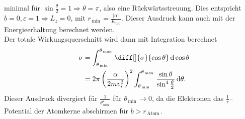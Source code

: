 \documentclass[a4paper,12pt]{article}
\newcommand{\td}{\,\text{d}}
\numberwithin{equation}{section}
\begin{document}
minimal für $\sin \tfrac{\theta }{2}=1\Rightarrow \theta =\pi $, also eine Rückwärtsstreuung. Dies entspricht $b=0,\varepsilon =1\Rightarrow L_z=0$, mit $r_{\,\text{min}\,}=\tfrac{|\alpha |}{E_{\,\text{tot}\,}}$. Dieser Ausdruck kann auch mit der Energieerhaltung berechnet werden.\\\indent
Der totale Wirkungsquerschnitt wird dann mit Integration berechnet
\begin{align*}
        &&\sigma &=\int_{\theta _{\,\text{min}\,}}^{\theta _{\,\text{max}\,}}\diff[]{\sigma }{\cos \theta }\td \cos \theta \\
        &&&=2\pi \left(\dfrac{\alpha }{2mv_i^2}\right)^2\int_{\theta _{\,\text{min}\,}}^{\theta _{\,\text{max}\,}}\dfrac{\sin \theta }{\sin ^4 \tfrac{\theta }{2}}\td \theta 
.\end{align*}
Dieser Ausdruck divergiert für $\tfrac{1}{\theta ^2_{\,\text{min}\,}}$ für $\theta _{\,\text{min}\,}\rightarrow 0$, da die Elektronen das $\tfrac{1}{r}$--Potential der Atomkerne abschirmen für $b>r_{\,\text{Atom}\,}$.
\end{document}
